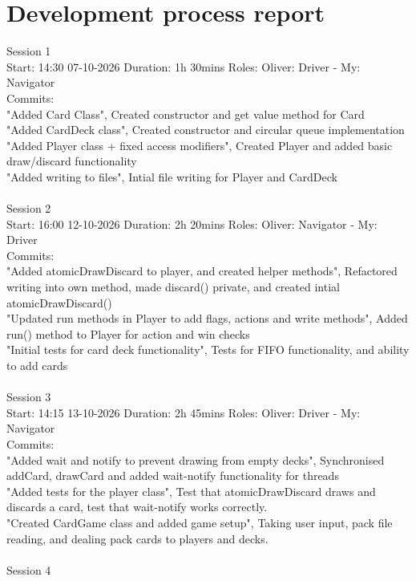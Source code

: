 \documentclass[11p]{article}
\begin{document}
\section{Development process report}
Session 1\\
Start: 14:30 07-10-2026
Duration: 1h 30mins
Roles:  Oliver: Driver - My: Navigator \\
Commits:\\
"Added Card Class", Created constructor and get value method for Card\\
"Added CardDeck class", Created constructor and circular queue implementation\\
"Added Player class + fixed access modifiers", Created Player and added basic draw/discard functionality\\
"Added writing to files", Intial file writing for Player and CardDeck\\\\
Session 2\\
Start: 16:00 12-10-2026
Duration: 2h 20mins
Roles:  Oliver: Navigator - My: Driver\\
Commits:\\
"Added atomicDrawDiscard to player, and created helper methods", Refactored writing into own method, made discard() private, and created intial atomicDrawDiscard()\\
"Updated run methods in Player to add flags, actions and write methods", Added run() method to Player for action and win checks\\
"Initial tests for card deck functionality", Tests for FIFO functionality, and ability to add cards\\\\
Session 3\\
Start: 14:15 13-10-2026
Duration: 2h 45mins
Roles:  Oliver: Driver - My: Navigator \\
Commits:\\
    "Added wait and notify to prevent drawing from empty decks", Synchronised addCard, drawCard and added wait-notify functionality for threads\\
    "Added tests for the player class", Test that atomicDrawDiscard draws and discards a card, test that wait-notify works correctly.\\
    "Created CardGame class and added game setup", Taking user input, pack file reading, and dealing pack cards to players and decks.\\\\
Session 4\\
\end{document}
